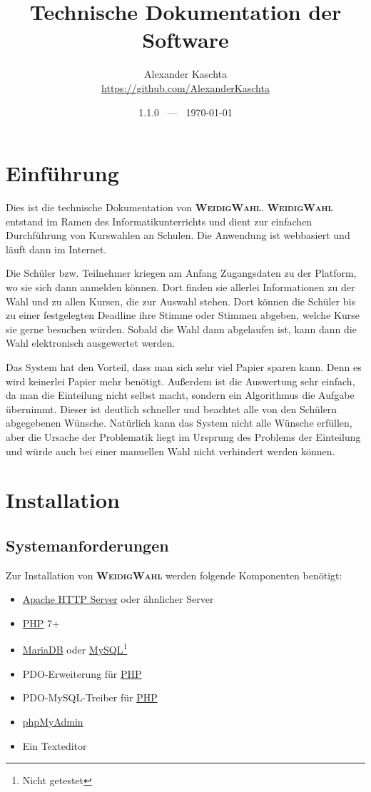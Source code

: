 \documentclass[ngerman]{ltxdoc}
\title{Technische Dokumentation der Software \name}
\author{Alexander Kaschta \\ \url{https://github.com/AlexanderKaschta}}
\date{1.1.0 ~---~ \today}
\newcommand{\name}{\textbf{\textsc{WeidigWahl}}\xspace}
\begin{document}
\maketitle
\tableofcontents

\section{Einführung}

Dies ist die technische Dokumentation von \name. \name entstand im Ramen des
Informatikunterrichts und dient zur einfachen Durchführung von Kurswahlen an Schulen.
Die Anwendung ist webbasiert und läuft dann im Internet.

Die Schüler bzw. Teilnehmer kriegen am Anfang Zugangsdaten zu der Platform, wo
sie sich dann anmelden können. Dort finden sie allerlei Informationen zu der Wahl
und zu allen Kursen, die zur Auswahl stehen. Dort können die Schüler bis zu einer
festgelegten Deadline ihre Stimme oder Stimmen abgeben, welche Kurse sie gerne
besuchen würden. Sobald die Wahl dann abgelaufen ist, kann dann die Wahl
elektronisch ausgewertet werden.

Das System hat den Vorteil, dass man sich sehr viel Papier sparen kann. Denn es
wird keinerlei Papier mehr benötigt. Außerdem ist die Auswertung sehr einfach, da
man die Einteilung nicht selbst macht, sondern ein Algorithmus die Aufgabe übernimmt.
Dieser ist deutlich schneller und beachtet alle von den Schülern abgegebenen Wünsche.
Natürlich kann das System nicht alle Wünsche erfüllen, aber die Ursache der Problematik
liegt im Ursprung des Problems der Einteilung und würde auch bei einer manuellen
Wahl nicht verhindert werden können.

\section{Installation}

\subsection{Systemanforderungen}

Zur Installation von \name werden folgende Komponenten benötigt:

\begin{itemize}
  \item \href{http://httpd.apache.org/}{Apache HTTP Server} oder ähnlicher Server
  \item \href{https://www.php.net/}{PHP} 7+
  \item \href{https://mariadb.org/}{MariaDB} oder \href{https://www.mysql.com/}{MySQL}\footnote{Nicht getestet}
  \item PDO-Erweiterung für \href{https://www.php.net/}{PHP}
  \item PDO-MySQL-Treiber für \href{https://www.php.net/}{PHP}
  \item \href{https://www.phpmyadmin.net/}{phpMyAdmin}
  \item Ein Texteditor
\end{itemize}
\end{document}

